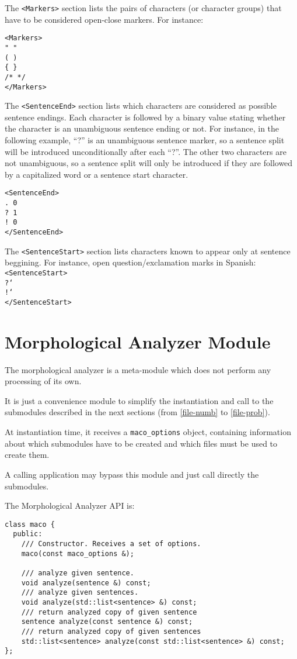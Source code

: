 \documentclass[a4paper]{book}
\begin{document}
The \verb#<Markers># section lists the pairs of characters (or
character groups) that have to be considered open-close markers. For instance:
\begin{verbatim}
<Markers>
" "
( )
{ }
/* */
</Markers>
\end{verbatim}

The \verb#<SentenceEnd># section lists which characters are considered
as possible sentence endings. Each character is followed by a binary
value stating whether the character is an unambiguous sentence ending
or not. For instance, in the following example, ``?'' is an unambiguous
sentence marker, so a sentence split will be introduced
unconditionally after each ``?''.  The other two characters are not
unambiguous, so a sentence split will only be introduced if they are
followed by a capitalized word or a sentence start character.
\begin{verbatim}
<SentenceEnd>
. 0
? 1
! 0
</SentenceEnd>
\end{verbatim}

The \verb#<SentenceStart># section lists characters known to appear
only at sentence beggining. For instance, open question/exclamation
marks in Spanish:\\
\verb#<SentenceStart>#\\
{\tt ?` }\\
{\tt !` }\\
\verb#</SentenceStart>#

\section{Morphological Analyzer Module}
\label{sec-maco}

  The morphological analyzer is a meta-module which does not perform
  any processing of its own.

  It is just a convenience module to simplify the instantiation and
  call to the submodules described in the next sections (from
  \ref{file-numb} to \ref{file-prob}).

  At instantiation time, it receives a {\tt maco\_options} object,
  containing information about which submodules have to be created and
  which files must be used to create them.

  A calling application may bypass this module and just call directly
  the submodules.

\noindent The Morphological Analyzer API is:
\begin{verbatim}
class maco {
  public:
    /// Constructor. Receives a set of options.
    maco(const maco_options &); 

    /// analyze given sentence.
    void analyze(sentence &) const;
    /// analyze given sentences.
    void analyze(std::list<sentence> &) const;
    /// return analyzed copy of given sentence
    sentence analyze(const sentence &) const;
    /// return analyzed copy of given sentences
    std::list<sentence> analyze(const std::list<sentence> &) const;
};
\end{verbatim}
\end{document}
